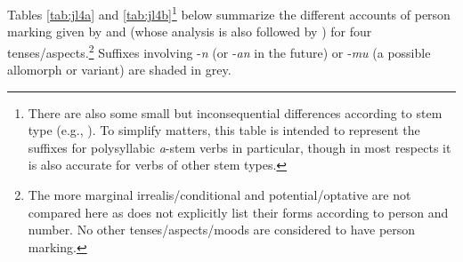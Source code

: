 \documentclass[output=paper]{langsci/langscibook}
\begin{document}
 Tables \ref{tab:jl4a} and \ref{tab:jl4b}\footnote{There are also some small but inconsequential differences according to stem type (e.g., \citealt[23‒27]{CainGair2000}). To simplify matters, this table is intended to represent the suffixes for polysyllabic \textit{a}-stem verbs in particular, though in most respects it is also accurate for verbs of other stem types.}
  below summarize the different accounts of person marking given by \cite{Fritz2002} and \cite{CainGair2000} (whose analysis is also followed by \citealt{Maumoon2002}) for four tenses/aspects.\footnote{The more marginal irrealis/conditional and potential/optative are not compared here as \cite{Fritz2002} does not explicitly list their forms according to person and number. No other tenses/aspects/moods are considered to have person marking.} Suffixes involving -\textit{n} (or -\textit{an} in the future) or ‑\textit{mu} (a possible allomorph or variant) are shaded in grey.
 

\end{document}
